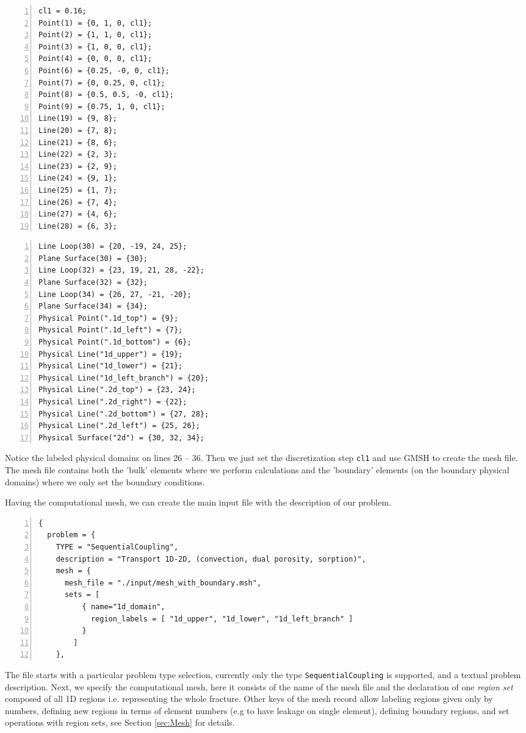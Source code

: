 \documentclass[12pt,a4paper]{report}
\begin{document}
\begin{multicols}{2}
{\small
\begin{Verbatim}[numbers=left]
cl1 = 0.16;
Point(1) = {0, 1, 0, cl1};
Point(2) = {1, 1, 0, cl1};
Point(3) = {1, 0, 0, cl1};
Point(4) = {0, 0, 0, cl1};
Point(6) = {0.25, -0, 0, cl1};
Point(7) = {0, 0.25, 0, cl1};
Point(8) = {0.5, 0.5, -0, cl1};
Point(9) = {0.75, 1, 0, cl1};
Line(19) = {9, 8};
Line(20) = {7, 8};
Line(21) = {8, 6};
Line(22) = {2, 3};
Line(23) = {2, 9};
Line(24) = {9, 1};
Line(25) = {1, 7};
Line(26) = {7, 4};
Line(27) = {4, 6};
Line(28) = {6, 3};
\end{Verbatim}
\columnbreak
\begin{Verbatim}[numbers=left, firstnumber=last]
Line Loop(30) = {20, -19, 24, 25};
Plane Surface(30) = {30};
Line Loop(32) = {23, 19, 21, 28, -22};
Plane Surface(32) = {32};
Line Loop(34) = {26, 27, -21, -20};
Plane Surface(34) = {34};
Physical Point(".1d_top") = {9};
Physical Point(".1d_left") = {7};
Physical Point(".1d_bottom") = {6};
Physical Line("1d_upper") = {19};
Physical Line("1d_lower") = {21};
Physical Line("1d_left_branch") = {20};
Physical Line(".2d_top") = {23, 24};
Physical Line(".2d_right") = {22};
Physical Line(".2d_bottom") = {27, 28};
Physical Line(".2d_left") = {25, 26};
Physical Surface("2d") = {30, 32, 34};
\end{Verbatim}
}
\end{multicols}

Notice the labeled physical domains on lines 26 -- 36. Then we just set the discretization step \verb'cl1' and use GMSH to create the mesh file.
The mesh file contains both the 'bulk' elements where we perform calculations and the 'boundary' elements (on the boundary physical domains) where we only set the boundary conditions.

\pagebreak
Having the computational mesh, we can create the main input file with the description of our problem. 
\begin{Verbatim}[numbers=left]
{
  problem = {
    TYPE = "SequentialCoupling", 
    description = "Transport 1D-2D, (convection, dual porosity, sorption)", 
    mesh = {
      mesh_file = "./input/mesh_with_boundary.msh",
      sets = [
          { name="1d_domain", 
            region_labels = [ "1d_upper", "1d_lower", "1d_left_branch" ]
          }
        ]
    },  
\end{Verbatim}
The file starts with a particular problem type selection, currently only the type \verb'SequentialCoupling' is supported, and a textual problem description.
Next, we specify the computational mesh, here it consists of the name of the mesh file and the declaration of one {\it region set} 
composed of all 1D regions i.e. representing the whole fracture. Other keys of the mesh record allow labeling regions given only by numbers, 
defining new regions in terms of element numbers (e.g to have leakage on single element), 
defining boundary regions, and set operations with region sets, see Section \ref{sec:Mesh} for details.
\end{document}

